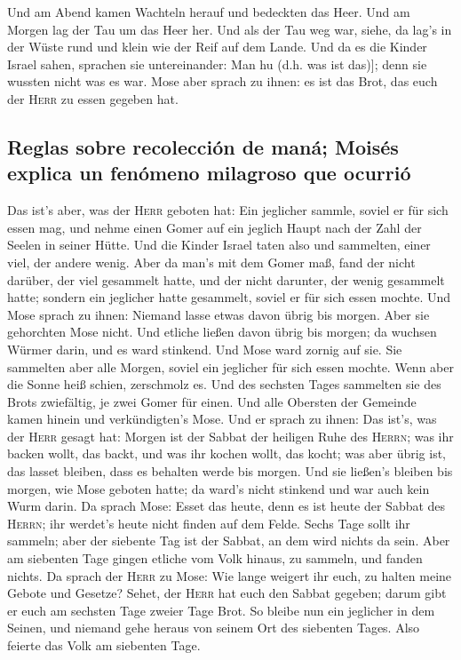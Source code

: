  Und am Abend kamen Wachteln herauf und bedeckten das
Heer. Und am Morgen lag der Tau um das Heer her.  Und als
der Tau weg war, siehe, da lag's in der Wüste rund und klein wie der
Reif auf dem Lande.  Und da es die Kinder Israel sahen,
sprachen sie untereinander: Man hu (d.h. was ist das){]}; denn sie
wussten nicht was es war. Mose aber sprach zu ihnen: es ist das Brot,
das euch der \textsc{Herr} zu essen gegeben hat.

\hypertarget{reglas-sobre-recolecciuxf3n-de-manuxe1-moisuxe9s-explica-un-fenuxf3meno-milagroso-que-ocurriuxf3}{%
\subsection{Reglas sobre recolección de maná; Moisés explica un fenómeno
milagroso que
ocurrió}\label{reglas-sobre-recolecciuxf3n-de-manuxe1-moisuxe9s-explica-un-fenuxf3meno-milagroso-que-ocurriuxf3}}

 Das ist's aber, was der \textsc{Herr} geboten hat: Ein
jeglicher sammle, soviel er für sich essen mag, und nehme einen Gomer
auf ein jeglich Haupt nach der Zahl der Seelen in seiner Hütte.
 Und die Kinder Israel taten also und sammelten, einer
viel, der andere wenig.  Aber da man's mit dem Gomer maß,
fand der nicht darüber, der viel gesammelt hatte, und der nicht
darunter, der wenig gesammelt hatte; sondern ein jeglicher hatte
gesammelt, soviel er für sich essen mochte.  Und Mose
sprach zu ihnen: Niemand lasse etwas davon übrig bis morgen.
 Aber sie gehorchten Mose nicht. Und etliche ließen davon
übrig bis morgen; da wuchsen Würmer darin, und es ward stinkend. Und
Mose ward zornig auf sie.  Sie sammelten aber alle
Morgen, soviel ein jeglicher für sich essen mochte. Wenn aber die Sonne
heiß schien, zerschmolz es.  Und des sechsten Tages
sammelten sie des Brots zwiefältig, je zwei Gomer für einen. Und alle
Obersten der Gemeinde kamen hinein und verkündigten's Mose.
 Und er sprach zu ihnen: Das ist's, was der \textsc{Herr}
gesagt hat: Morgen ist der Sabbat der heiligen Ruhe des \textsc{Herrn};
was ihr backen wollt, das backt, und was ihr kochen wollt, das kocht;
was aber übrig ist, das lasset bleiben, dass es behalten werde bis
morgen.  Und sie ließen's bleiben bis morgen, wie Mose
geboten hatte; da ward's nicht stinkend und war auch kein Wurm darin.
 Da sprach Mose: Esset das heute, denn es ist heute der
Sabbat des \textsc{Herrn}; ihr werdet's heute nicht finden auf dem
Felde.  Sechs Tage sollt ihr sammeln; aber der siebente
Tag ist der Sabbat, an dem wird nichts da sein.  Aber am
siebenten Tage gingen etliche vom Volk hinaus, zu sammeln, und fanden
nichts.  Da sprach der \textsc{Herr} zu Mose: Wie lange
weigert ihr euch, zu halten meine Gebote und Gesetze? 
Sehet, der \textsc{Herr} hat euch den Sabbat gegeben; darum gibt er euch
am sechsten Tage zweier Tage Brot. So bleibe nun ein jeglicher in dem
Seinen, und niemand gehe heraus von seinem Ort des siebenten Tages.
 Also feierte das Volk am siebenten Tage.

